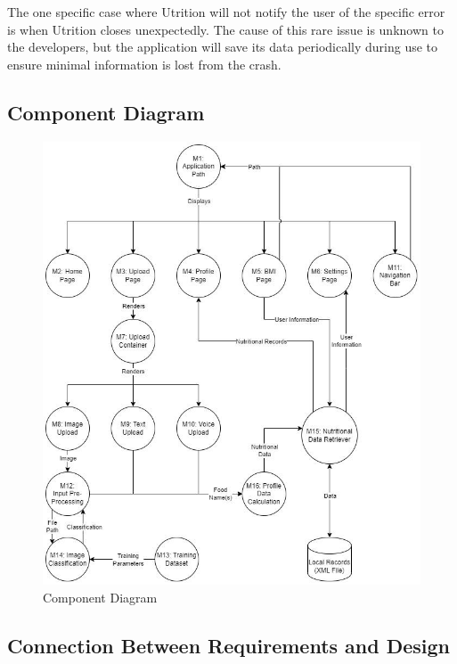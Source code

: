 \documentclass[12pt, titlepage]{article}
\begin{document}
The one specific case where Utrition will not notify the user of the specific error is when Utrition closes unexpectedly. The cause of this rare issue is unknown to the developers, but the application will save its data periodically during use to ensure minimal information is lost from the crash.

\subsection{Component Diagram}
\newpage
\begin{figure}[H]
	\centering
	\includegraphics[scale=0.63]{componentdiagram.jpg}
	\caption{Component Diagram}
\end{figure}

\subsection{Connection Between Requirements and Design} 

\end{document}
